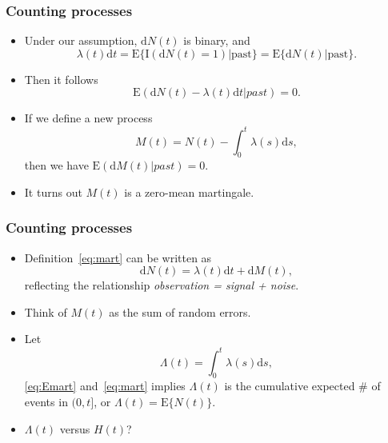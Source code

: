 \documentclass[10pt]{beamer}\usepackage[]{graphicx}\usepackage[]{color}
\newcommand{\dif}{\mathrm{d}}
\newcommand{\dt}{\mathrm{d}t}
\newcommand{\empr}[1]{{\emph{\color{red}#1}}}
\newcommand{\E}{\mathrm{E}}
\newcommand{\I}{\mathrm{I}}
\begin{document}
\begin{frame}
  \frametitle{Counting processes}
  \begin{itemize}  
  \item Under our assumption, $\dif N(t)$ is binary, and 
    $$\lambda(t) \dt = \E\{\I(\dif N(t) = 1)|\mbox{past}\} = \E\{\dif N(t)|\mbox{past}\}.$$
  \item Then it follows
    \begin{equation}
      \label{eq:Emart}
      \E(\dif N(t) - \lambda(t) \dt |past) = 0.
    \end{equation}
  \item If we define a new process 
    \begin{equation}
      \label{eq:mart}
      M(t) = N(t) - \int_0^t\lambda(s) \dif s,
    \end{equation}
    then we have $\E(\dif M(t) | past) = 0$.
  \item It turns out $M(t)$ is a zero-mean martingale.
  \end{itemize}
\end{frame}

\begin{frame}
  \frametitle{Counting processes}
  \begin{itemize}  
  \item Definition~\eqref{eq:mart} can be written as
    \begin{equation}
      \dif N(t) = \lambda(t) \dif t + \dif M(t),
      \label{eq:mart2}
    \end{equation}
    reflecting the relationship \empr{observation = signal + noise}.
  \item Think of $M(t)$ as the sum of random errors.
  \item Let 
    $$\Lambda(t) = \int_0^t\lambda(s)\dif s,$$
    \eqref{eq:Emart} and~\eqref{eq:mart} implies $\Lambda(t)$ is the cumulative expected \# of events in $(0, t]$, 
    or $\Lambda(t) = \E\{N(t)\}$.
  \item $\Lambda(t)$ versus $H(t)$?
  \end{itemize}
\end{frame} 
\end{document}
